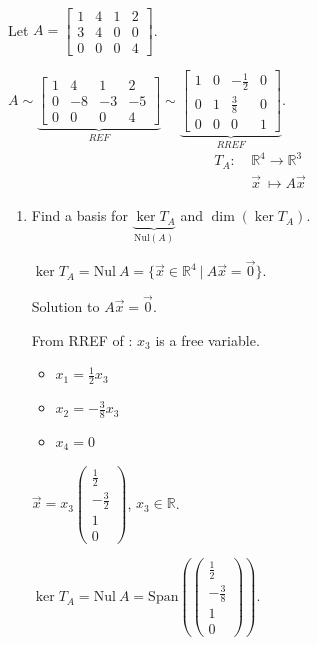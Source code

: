 \documentclass[11pt,fleqn]{book} %
\begin{document}
\begin{example}
{~~~}

    Let $A = \begin{bmatrix} 1&4&1&2 \\ 3&4&0&0 \\ 0&0&0&4 \end{bmatrix}$.

    $A \sim \underbrace{ \begin{bmatrix} 1&4&1&2\\0&-8&-3&-5\\0&0&0&4 \end{bmatrix} }_{REF} \sim \underbrace{ \begin{bmatrix} 1&0&-\frac{1}{2}&0\\0&1&\frac{3}{8}&0\\0&0&0&1 \end{bmatrix}}_{RREF}$.
    \begin{align*}
        T_A:
        &~\mathbb{R}^4 \to \mathbb{R}^3
        \\
        &~\vec{x} ~\mapsto A\vec{x}
    \end{align*}

    \begin{enumerate}
        \item Find a basis for $\underbrace{\ker T_A}_{\mathrm{Nul}(A)}$ and $\dim\left( \ker T_A \right)$.

        $\ker T_A = \mathrm{Nul}~A = \{ \vec{x} \in \mathbb{R}^4 ~|~ A\vec{x} = \vec{0} \}$.

        Solution to $A\vec{x} = \vec{0}$.

        From RREF of : $x_3$ is a free variable.
        \begin{itemize}
            \item ${x_1} = \frac{1}{2}{x_3}$
            \item ${x_2} = -\frac{3}{8}{x_3}$
            \item $x_4 = 0$
        \end{itemize}

        $\vec{x} = {x_3} \begin{pmatrix} \frac{1}{2} \\ -\frac{3}{2} \\ 1 \\ 0 \end{pmatrix}$, $x_3 \in \mathbb{R}$.

        $\ker T_A = \mathrm{Nul}~A = \mathrm{Span}\left( \begin{pmatrix} \frac12 \\ -\frac38 \\ 1 \\ 0 \end{pmatrix} \right)$.


\end{enumerate}
\end{example}
\end{document}
